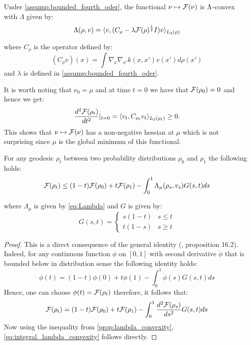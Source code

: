 \begin{proposition}
\label{prop:lambda_convexity} Under \cref{assump:bounded_fourth_oder}, the functional $\nu\mapsto {{\mathcal F}}(\nu)$ is $\text{\ensuremath{\Lambda}}$-convex
with $\Lambda$ given by:
\begin{equation}
\Lambda(\rho,v)=\langle v,(C_{\rho}-\lambda {{\mathcal F}}(\rho)^{\frac{1}{2}}I)v\rangle_{L_{2}(\rho)}\label{eq:Lambda}
\end{equation}

where $C_{\rho}$ is the operator defined by:
\[
(C_{\rho}v)(x)=\int\nabla_{x}\nabla_{x'}k(x,x')v(x')d\rho(x')
\] and $\lambda$ is defined in \cref{assump:bounded_fourth_oder}.
\end{proposition}
%
%
It is worth noting that $\nu_{0}=\mu$ and at time $t=0$ we have
that ${{\mathcal F}}(\rho_{0})=0$ and hence we get:
\[
\frac{d^{2}{{\mathcal F}}(\rho_{t})}{dt^{2}}\vert_{t=0}=\langle v_{t},C_{\rho_{t}}v_{t}\rangle_{L_{2}(\rho_{t})}\geq0.
\]
This shows that $\nu\mapsto {{\mathcal F}}(\nu)$ has a non-negative
hessian at $\mu$ which is not surprising since $\mu$ is the global
minimum of this functional.
\begin{corollary}\label{cor:integral_lambda_convexity}
For any geodesic $\rho_{t}$ between two probability distributions
$\rho_{0}$ and $\rho_{1}$ the following holds:
\begin{equation}
{{\mathcal F}}(\rho_{t})\leq(1-t){{\mathcal F}}(\rho_{0})+t{{\mathcal F}}(\rho_{1})-\int_{0}^{1}\Lambda_{\mu}(\rho_{s},v_{s})G(s,t)ds\label{eq:integral_lambda_convexity}
\end{equation}

where $\Lambda_{\mu}$ is given by \cref{eq:Lambda} and $G$ is given
by:
\[
G(s,t)=\begin{cases}
s(1-t) & s\leq t\\
t(1-s) & s\geq t
\end{cases}
\]
\end{corollary}
%
\begin{proof}
This is a direct consequence of the general identity (\cite{Villani:2009},
proposition 16.2). Indeed, for any continuous function $\phi$ on
$[0,1]$ with second derivative $\ddot{\phi}$ that is bounded below
in distribution sense the following identity holds:
\[
\phi(t)=(1-t)\phi(0)+t\phi(1)-\int_{0}^{1}\ddot{\phi}(s)G(s,t)ds
\]
Hence, one can choose $\phi(t)={{\mathcal F}}(\rho_{t})$ therefore,
it follows that:
\[
{{\mathcal F}}(\rho_{t})=(1-t){{\mathcal F}}(\rho_{0})+t{{\mathcal F}}(\rho_{1})-\int_{0}^{1}\frac{d^{2}{{\mathcal F}}(\rho_{s})}{ds^{2}}G(s,t)ds
\]
Now using the inequality from \cref{prop:lambda_convexity}, \cref{eq:integral_lambda_convexity}
follows directly. 
\end{proof}
